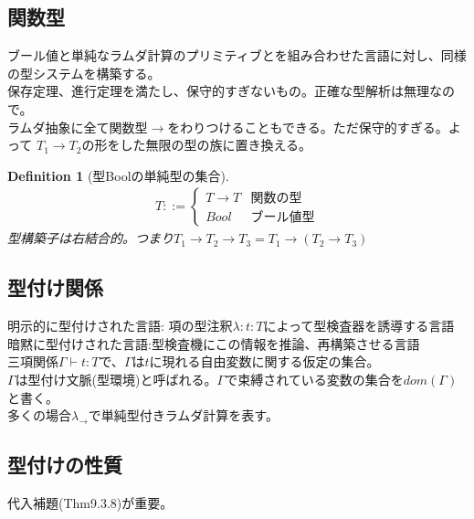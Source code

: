 \documentclass[a4paper,10pt]{article}
\newtheorem{definition}{Definition}[section]
\begin{document}
\subsection*{関数型}
ブール値と単純なラムダ計算のプリミティブとを組み合わせた言語に対し、同様の型システムを構築する。\\
保存定理、進行定理を満たし、保守的すぎないもの。正確な型解析は無理なので。\\
ラムダ抽象に全て関数型$\rightarrow$をわりつけることもできる。ただ保守的すぎる。よって
$T_1 \rightarrow T_2$の形をした無限の型の族に置き換える。
\begin{definition}[型Boolの単純型の集合]
\begin{align*}
T::=
\begin{cases}
T \rightarrow T & \text{関数の型}\\
Bool & \text{ブール値型}
\end{cases}
\end{align*}
型構築子は右結合的。つまり$T_1 \rightarrow T_2 \rightarrow T_3=T_1 \rightarrow (T_2 \rightarrow T_3)$
\end{definition}
\subsection*{型付け関係}
明示的に型付けされた言語: 項の型注釈$\lambda:t:T$によって型検査器を誘導する言語\\
暗黙に型付けされた言語:型検査機にこの情報を推論、再構築させる言語\\
三項関係$\Gamma \vdash t:T$で、$\Gamma$は$t$に現れる自由変数に関する仮定の集合。\\
$\Gamma$は型付け文脈(型環境)と呼ばれる。$\Gamma$で束縛されている変数の集合を$dom(\Gamma)$
と書く。\\
多くの場合$\lambda_{\rightarrow}$で単純型付きラムダ計算を表す。
\subsection*{型付けの性質}
代入補題(Thm9.3.8)が重要。
\end{document}
